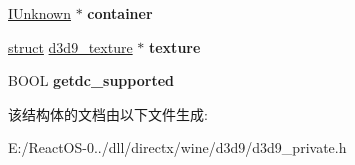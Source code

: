 \begin{DoxyCompactItemize}
\hyperlink{interface_i_unknown}{I\+Unknown} $\ast$ {\bfseries container}
\item 
\mbox{\label{structd3d9__surface_ace57469205ec17b3d8aca3f13ee2ecf8}} 
\hyperlink{interfacestruct}{struct} \hyperlink{structd3d9__texture}{d3d9\+\_\+texture} $\ast$ {\bfseries texture}
\item 
\mbox{\label{structd3d9__surface_a3149cc7dfbfcb528708c0dfbad139289}} 
B\+O\+OL {\bfseries getdc\+\_\+supported}
\end{DoxyCompactItemize}


该结构体的文档由以下文件生成\+:\begin{DoxyCompactItemize}
\item 
E\+:/\+React\+O\+S-\/0../dll/directx/wine/d3d9/d3d9\+\_\+private.\+h\end{DoxyCompactItemize}
